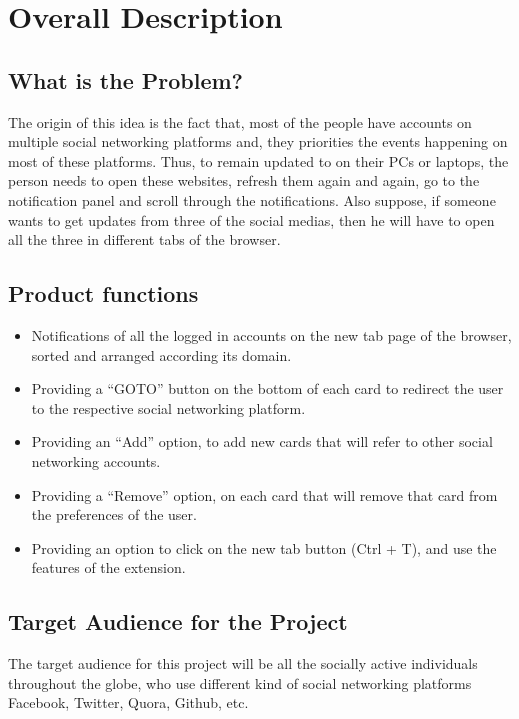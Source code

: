\documentclass[12pt]{article}
\begin{document}
\section{Overall Description}

\subsection{What is the Problem?}
The origin of this idea is the fact that, most of the people have accounts
on multiple social networking platforms and, they priorities the events
happening on most of these platforms. Thus, to remain updated to on
their PCs or laptops, the person needs to open these websites, refresh
them again and again, go to the notification panel and scroll through the
notifications. Also suppose, if someone wants to get updates from three
of the social medias, then he will have to open all the three in different
tabs of the browser.

\subsection{Product functions}
\begin{itemize}
    \item Notifications of all the logged in accounts on the new tab page of
the browser, sorted and arranged according its domain.
 
    \item   Providing a “GOTO” button on the bottom of each card to redirect
the user to the respective social networking platform.
 
    \item Providing an “Add” option, to add new cards that will refer to
other social networking accounts. 

\item Providing a “Remove” option, on each card that will remove that
card from the preferences of the user.
\item Providing an option to click on the new tab button (Ctrl + T), and
use the features of the extension.
\end{itemize}

\subsection{Target Audience for the Project}
The target audience for this project will be all the socially active
individuals throughout the globe, who use different kind of social
networking platforms Facebook, Twitter, Quora, Github, etc.
\end{document}
